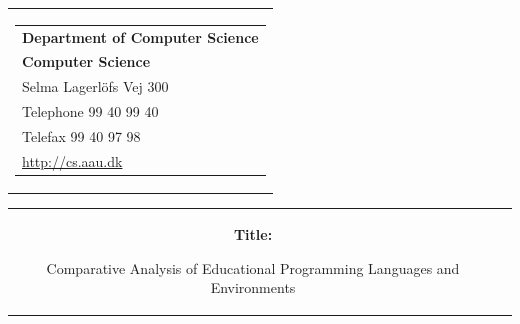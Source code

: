 \thispagestyle{empty}
\begin{titlepage}
\begin{nopagebreak}
{\samepage 
\begin{tabular}{r}
\parbox{\textwidth}{  
\hfill \parbox{5.9cm}{\begin{tabular}{l}
{\sf\small \textbf{Department of Computer Science}}\\
{\sf\small  \textbf{Computer Science}} \\
{\sf\small Selma Lagerl\"{o}fs Vej 300} \\
{\sf\small Telephone 99 40 99 40} \\
{\sf\small Telefax 99 40 97 98} \\
{\sf\small \url{http://cs.aau.dk}}
\end{tabular}}}
\\
\end{tabular}

\begin{tabular}{cc}
\parbox{7cm}{
\begin{description}

\item {\bf Title:} 

Comparative Analysis of Educational Programming Languages and Environments

\end{description}

\parbox{8cm}{

}}
\end{tabular}}
\end{nopagebreak}
\end{titlepage}
